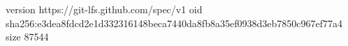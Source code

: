version https://git-lfs.github.com/spec/v1
oid sha256:e3dea8fdcd2e1d332316148beca7440da8fb8a35ef0938d3eb7850c967ef77a4
size 87544
